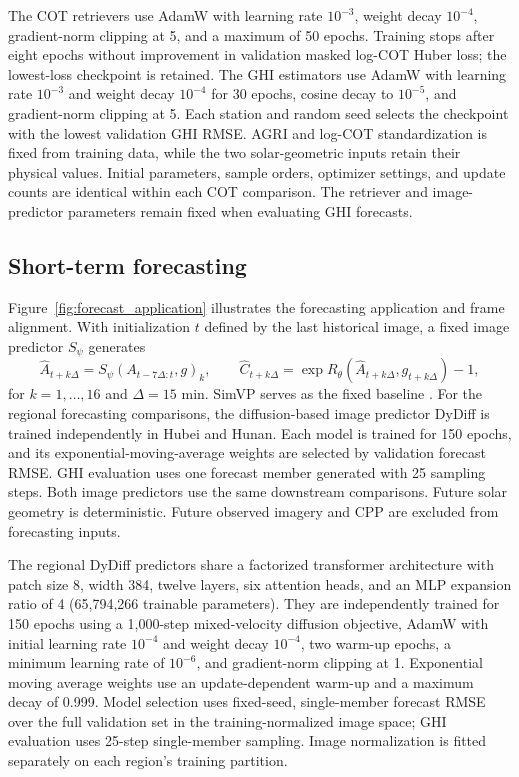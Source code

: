 \documentclass[11pt]{article}
\begin{document}
The COT retrievers use AdamW with learning rate $10^{-3}$, weight decay $10^{-4}$, gradient-norm clipping at 5, and a maximum of 50 epochs. Training stops after eight epochs without improvement in validation masked log-COT Huber loss; the lowest-loss checkpoint is retained. The GHI estimators use AdamW with learning rate $10^{-3}$ and weight decay $10^{-4}$ for 30 epochs, cosine decay to $10^{-5}$, and gradient-norm clipping at 5. Each station and random seed selects the checkpoint with the lowest validation GHI RMSE. AGRI and log-COT standardization is fixed from training data, while the two solar-geometric inputs retain their physical values. Initial parameters, sample orders, optimizer settings, and update counts are identical within each COT comparison. The retriever and image-predictor parameters remain fixed when evaluating GHI forecasts.

\subsection{Short-term forecasting}
Figure~\ref{fig:forecast_application} illustrates the forecasting application and frame alignment. With initialization $t$ defined by the last historical image, a fixed image predictor $S_\psi$ generates
\begin{equation}
\widehat A_{t+k\Delta}=S_\psi(A_{t-7\Delta:t},g)_{k},\qquad
\widehat C_{t+k\Delta}=\exp R_\theta(\widehat A_{t+k\Delta},g_{t+k\Delta})-1,
\label{eq:forecast}
\end{equation}
for $k=1,\ldots,16$ and $\Delta=15$ min. SimVP serves as the fixed baseline \cite{simvp,simvpv2}. For the regional forecasting comparisons, the diffusion-based image predictor DyDiff is trained independently in Hubei and Hunan. Each model is trained for 150 epochs, and its exponential-moving-average weights are selected by validation forecast RMSE. GHI evaluation uses one forecast member generated with 25 sampling steps. Both image predictors use the same downstream comparisons. Future solar geometry is deterministic. Future observed imagery and CPP are excluded from forecasting inputs.

The regional DyDiff predictors share a factorized transformer architecture with patch size 8, width 384, twelve layers, six attention heads, and an MLP expansion ratio of 4 (65,794,266 trainable parameters). They are independently trained for 150 epochs using a 1,000-step mixed-velocity diffusion objective, AdamW with initial learning rate $10^{-4}$ and weight decay $10^{-4}$, two warm-up epochs, a minimum learning rate of $10^{-6}$, and gradient-norm clipping at 1. Exponential moving average weights use an update-dependent warm-up and a maximum decay of 0.999. Model selection uses fixed-seed, single-member forecast RMSE over the full validation set in the training-normalized image space; GHI evaluation uses 25-step single-member sampling. Image normalization is fitted separately on each region's training partition.
\end{document}
